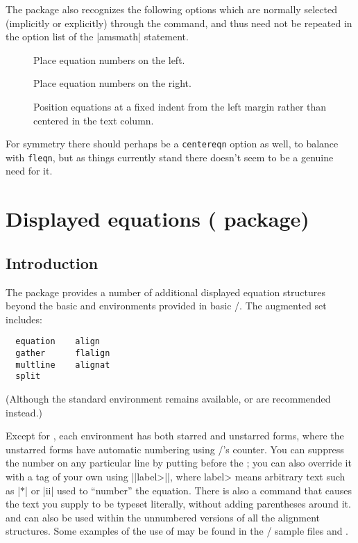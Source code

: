 \documentclass[leqno,titlepage,openany]{amsldoc}
\begin{document}
The  package also recognizes the following options which are
normally selected (implicitly or explicitly) through the
 command, and thus need not be repeated in the
option list of the |{amsmath}| statement.
\begin{description}

\item[] Place equation numbers on the left.

\item[] Place equation numbers on the right.

\item[] Position equations at a fixed indent from the left
margin rather than centered in the text column.

\end{description}

For symmetry there should perhaps be a \verb"centereqn" option as well,
to balance with \verb"fleqn", but as things currently stand there
doesn't seem to be a genuine need for it.

\chapter{Displayed equations ( package)}

\section{Introduction}
The  package provides a number of additional displayed
equation structures beyond the basic
 and  environments provided in basic
\latex/. The augmented set includes:
\begin{verbatim}
  equation    align
  gather      flalign
  multline    alignat
  split
\end{verbatim}
(Although the standard  environment remains available,
 or  are recommended instead.)

Except for , each environment has both starred and unstarred
forms, where the unstarred forms have automatic numbering using
\latex/'s  counter. You can suppress the number on any
particular line by putting  before the \cn{\\}; you can also
override it with a tag of your own
using |{|\<label>|}|, where \<label> means arbitrary text such
as |$*$| or |ii| used to ``number'' the equation. There is also a
 command that causes the text you supply to be typeset
literally, without adding parentheses around it.  and 
can also be used within the unnumbered versions of all the 
alignment structures. Some examples of the use of  may be found
in the \amslatex/ sample files  and .
\end{document}
